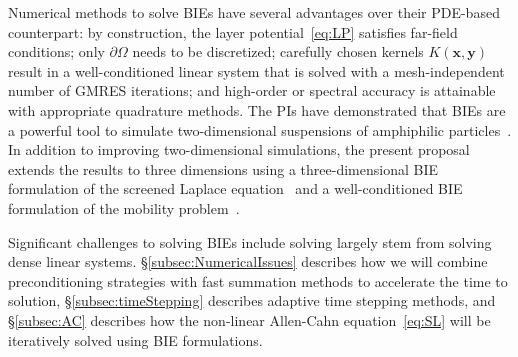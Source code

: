 Numerical methods to solve BIEs have several advantages over their
PDE-based counterpart: by construction, the layer
potential~\eqref{eq:LP} satisfies far-field conditions; only
$\partial\Omega$ needs to be discretized; carefully chosen kernels
$K(\mathbf{x},\mathbf{y})$ result in a well-conditioned linear system
that is solved with a mesh-independent number of GMRES iterations; and
high-order or spectral accuracy is attainable with appropriate
quadrature methods. The PIs have demonstrated that BIEs are a powerful
tool to simulate two-dimensional suspensions of amphiphilic
particles~\cite{Fu2018_SIAM, FuQuRyYo20}. In addition to improving
two-dimensional simulations, the present proposal extends the results to
three dimensions using a three-dimensional BIE formulation of the
screened Laplace equation~\cite{ying_2006} and a well-conditioned BIE
formulation of the mobility problem~\cite{manasthesis, rac-gre2016}.

Significant challenges to solving BIEs include solving largely stem from
solving dense linear systems. \S\ref{subsec:NumericalIssues}
describes how we will combine preconditioning strategies with fast
summation methods to accelerate the time to solution,
\S\ref{subsec:timeStepping} describes adaptive time stepping methods,
and \S\ref{subsec:AC} describes how the non-linear Allen-Cahn
equation~\eqref{eq:SL} will be iteratively solved using BIE
formulations.

